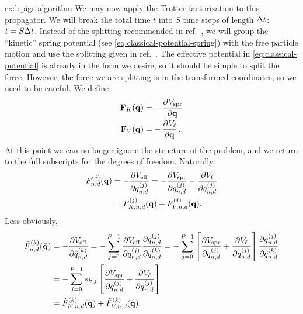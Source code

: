 \begin{DefAnswer}{ex:lepigs-algorithm}
	We may now apply the Trotter factorization to this propagator.
	We will break the total time $t$ into $S$ time steps of length $\Delta t$: $t = S \Delta t$.
	Instead of the splitting recommended in ref.~\cite{bussi2007accurate}, we will group the ``kinetic'' spring potential (see \cref{eq:classical-potential-spring}) with the free particle motion and use the splitting given in ref.~\cite{ceriotti2010efficient}.
	The effective potential in \cref{eq:classical-potential} is already in the form we desire, so it should be simple to split the force.
	However, the force we are splitting is in the transformed coordinates, so we need to be careful.
	We define
	\begin{subequations}
	\begin{align}
		\vec{F}_K(\vec{q})
		&= -\dpd{\Vspring}{\vec{q}} \\
		\vec{F}_V(\vec{q})
		&= -\dpd{V_\links}{\vec{q}}.
	\end{align}
	\end{subequations}
	At this point we can no longer ignore the structure of the problem, and we return to the full subscripts for the degrees of freedom.
	Naturally,
	\begin{subequations}
	\begin{align}
		F_{n,d}^{(j)}(\bm{\mathbf{q}})
		&= -\frac{\partial V_\mathrm{eff}}{\partial q_{n,d}^{(j)}}
		= -\frac{\partial V_\mathrm{spr}}{\partial q_{n,d}^{(j)}} - \frac{\partial V_\ell}{\partial q_{n,d}^{(j)}} \\
		&= F_{K,n,d}^{(j)}(\bm{\mathbf{q}}) + F_{V,n,d}^{(j)}(\bm{\mathbf{q}}).
	\end{align}
	\end{subequations}
	Less obviously,
	\begin{subequations}
	\begin{align}
		\nm{F}_{n,d}\bead{k}(\nm{\vec{q}})
		&= -\frac{\partial \Veff}{\partial \nm{q}_{n,d}\bead{k}}
		= -\sum_{j=0}^{P-1} \frac{\partial \Veff}{\partial q_{n,d}\bead{j}} \frac{\partial q_{n,d}\bead{j}}{\partial \nm{q}_{n,d}\bead{k}}
		= -\sum_{j=0}^{P-1} \left[ \frac{\partial \Vspring}{\partial q_{n,d}\bead{j}} + \frac{\partial V_\links}{\partial q_{n,d}\bead{j}} \right] \frac{\partial q_{n,d}\bead{j}}{\partial \nm{q}_{n,d}\bead{k}} \\
		&= -\sum_{j=0}^{P-1} s_{k,j} \left[ \frac{\partial \Vspring}{\partial q_{n,d}\bead{j}} + \frac{\partial V_\links}{\partial q_{n,d}\bead{j}} \right]
				\label{eq:force-nm-transform} \\
		&= \nm{F}_{K,n,d}\bead{k}(\nm{\vec{q}}) + \nm{F}_{V,n,d}\bead{k}(\nm{\vec{q}}).

\end{align}
\end{subequations}
\end{DefAnswer}
